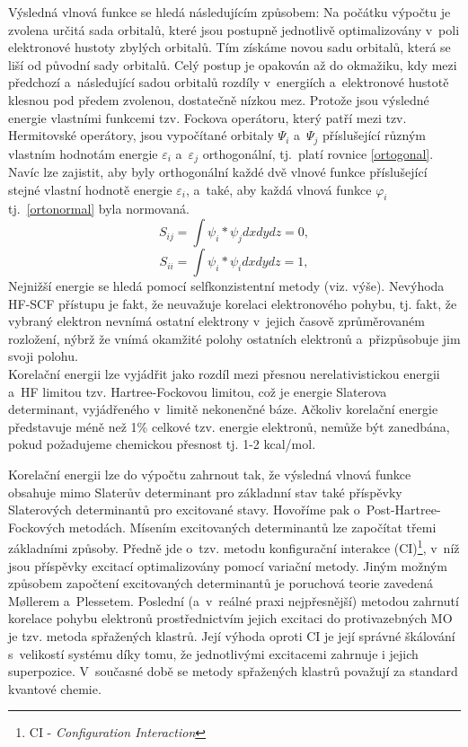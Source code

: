 \documentclass[
digital, %
table,   %
lof,     %
lot,     %
oneside,
]{fithesis3}
\begin{document}
Výsledná vlnová funkce se hledá následujícím způsobem: Na počátku výpočtu je zvolena určitá sada orbitalů, které jsou postupně jednotlivě optimalizovány v~poli elektronové hustoty zbylých orbitalů. Tím získáme novou sadu orbitalů, která se liší od původní sady orbitalů. Celý postup je opakován až do okmažiku, kdy mezi předchozí a~následující sadou orbitalů rozdíly v~energiích a~elektronové hustotě klesnou pod předem zvolenou, dostatečně nízkou mez. Protože jsou výsledné energie vlastními funkcemi tzv. Fockova operátoru, který patří mezi tzv. Hermitovské operátory, jsou vypočítané orbitaly $\Psi_i$ a~$\Psi_j$ příslušející různým vlastním hodnotám energie $\varepsilon_i $ a~$\varepsilon_j$ orthogonální, tj.~platí rovnice \ref{ortogonal}. Navíc lze zajistit, aby byly orthogonální každé dvě vlnové funkce příslušející stejné vlastní hodnotě energie $\varepsilon_i$, a~také, aby každá vlnová funkce $\varphi_i$ tj.~\ref{ortonormal} byla normovaná.
\begin{equation}
S_{ij} = \int \psi_i * \psi_j dx dy dz = 0,
\label{ortogonal}
\end{equation}
\begin{equation}
S_{ii} = \int \psi_i * \psi_i dx dy dz = 1,
\label{ortonormal}
\end{equation}
Nejnižší energie se hledá pomocí selfkonzistentní metody (viz. výše). Nevýhoda HF-SCF přístupu je fakt, že neuvažuje korelaci elektronového pohybu, tj. fakt, že vybraný elektron nevnímá ostatní elektrony v~jejich časově zprůměrovaném rozložení, nýbrž že vnímá okamžité polohy ostatních elektronů a~přizpůsobuje jim svoji polohu.\\

Korelační energii lze vyjádřit jako rozdíl mezi přesnou nerelativistickou energii a~HF limitou tzv. Hartree-Fockovou limitou, což je energie Slaterova determinant, vyjádřeného v~limitě nekonenčné báze. Ačkoliv korelační energie představuje méně než 1\% celkové tzv. energie elektronů, nemůže být zanedbána, pokud požadujeme chemickou přesnost tj. 1-2 kcal/mol.

Korelační energii lze do výpočtu zahrnout tak, že výsledná vlnová funkce obsahuje mimo Slaterův determinant pro základnní stav také příspěvky Slaterových determinantů pro excitované stavy. Hovoříme pak o~Post-Hartree-Fockových metodách. Mísením excitovaných determinantů lze započítat třemi základními způsoby. Předně jde o~tzv. metodu konfigurační interakce (CI)\footnote{CI - \textit{Configuration Interaction}}, v~níž jsou příspěvky excitací optimalizovány pomocí variační metody. Jiným možným způsobem započtení excitovaných determinantů je poruchová teorie zavedená M{\o}llerem a~Plessetem. Poslední (a~v~reálné praxi nejpřesnější) metodou zahrnutí korelace pohybu elektronů prostřednictvím jejich excitaci do protivazebných MO je tzv. metoda spřažených klastrů. Její výhoda oproti CI je její správné škálování s~velikostí systému díky tomu, že jednotlivými excitacemi zahrnuje i jejich superpozice. V~současné době se metody spřažených klastrů považují za standard kvantové chemie.
\end{document}
